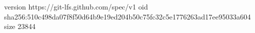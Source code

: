 version https://git-lfs.github.com/spec/v1
oid sha256:510c498da07f8f50d64b9e19ed204b50c75fc32c5e1776263ad17ee95033a604
size 23844
